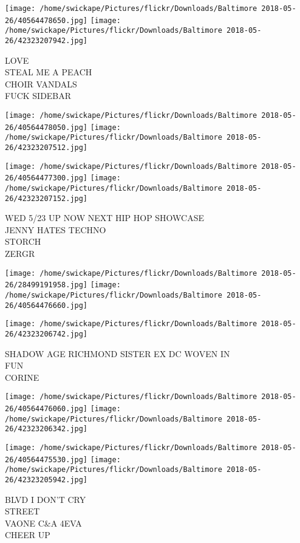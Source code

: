 \documentclass[10pt,letterpaper]{article}
\begin{document}
\texttt{[image: /home/swickape/Pictures/flickr/Downloads/Baltimore 2018-05-26/40564478650.jpg]}
\texttt{[image: /home/swickape/Pictures/flickr/Downloads/Baltimore 2018-05-26/42323207942.jpg]}

LOVE\\
STEAL ME A PEACH\\
CHOIR VANDALS\\
FUCK SIDEBAR
\pagebreak

\texttt{[image: /home/swickape/Pictures/flickr/Downloads/Baltimore 2018-05-26/40564478050.jpg]}
\texttt{[image: /home/swickape/Pictures/flickr/Downloads/Baltimore 2018-05-26/42323207512.jpg]}

\texttt{[image: /home/swickape/Pictures/flickr/Downloads/Baltimore 2018-05-26/40564477300.jpg]}
\texttt{[image: /home/swickape/Pictures/flickr/Downloads/Baltimore 2018-05-26/42323207152.jpg]}

WED 5/23 UP NOW NEXT HIP HOP SHOWCASE\\
JENNY HATES TECHNO\\
STORCH\\
ZERGR
\pagebreak

\texttt{[image: /home/swickape/Pictures/flickr/Downloads/Baltimore 2018-05-26/28499191958.jpg]}
\texttt{[image: /home/swickape/Pictures/flickr/Downloads/Baltimore 2018-05-26/40564476660.jpg]}

\vspace{0.25in}
\texttt{[image: /home/swickape/Pictures/flickr/Downloads/Baltimore 2018-05-26/42323206742.jpg]}

SHADOW AGE RICHMOND SISTER EX DC WOVEN IN\\
FUN\\
CORINE
\pagebreak

\texttt{[image: /home/swickape/Pictures/flickr/Downloads/Baltimore 2018-05-26/40564476060.jpg]}
\texttt{[image: /home/swickape/Pictures/flickr/Downloads/Baltimore 2018-05-26/42323206342.jpg]}

\texttt{[image: /home/swickape/Pictures/flickr/Downloads/Baltimore 2018-05-26/40564475530.jpg]}
\texttt{[image: /home/swickape/Pictures/flickr/Downloads/Baltimore 2018-05-26/42323205942.jpg]}

BLVD I DON'T CRY\\
STREET\\
VAONE C\&A 4EVA\\
CHEER UP
\pagebreak
\end{document}
